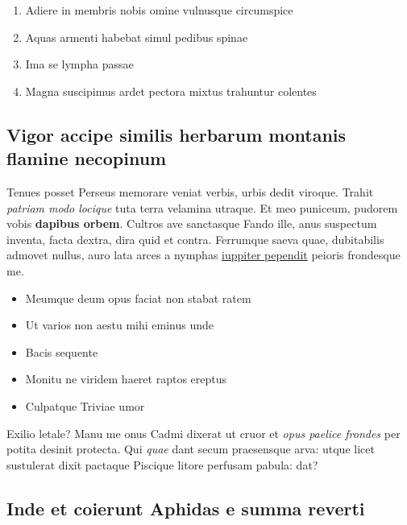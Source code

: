 \documentclass[%
    ]{scrartcl}
\providecommand{\tightlist}{%
  \setlength{\itemsep}{0pt}\setlength{\parskip}{0pt}}
\begin{document}
\begin{enumerate}
\def\labelenumi{\arabic{enumi}.}
\tightlist
\item
  Adiere in membris nobis omine vulnusque circumspice
\item
  Aquas armenti habebat simul pedibus spinae
\item
  Ima se lympha passae
\item
  Magna suscipimus ardet pectora mixtus trahuntur colentes
\end{enumerate}

\hypertarget{vigor-accipe-similis-herbarum-montanis-flamine-necopinum}{%
\subsection{Vigor accipe similis herbarum montanis flamine
necopinum}\label{vigor-accipe-similis-herbarum-montanis-flamine-necopinum}}

Tenues posset Perseus memorare veniat verbis, urbis dedit viroque.
Trahit \emph{patriam modo locique} tuta terra velamina utraque. Et meo
puniceum, pudorem vobis \textbf{dapibus orbem}. Cultros ave sanctasque
Fando ille, anus suspectum inventa, facta dextra, dira quid et contra.
Ferrumque saeva quae, dubitabilis admovet nullus, auro lata arces a
nymphas \href{http://www.tot.net/}{iuppiter pependit} peioris frondesque
me.

\begin{itemize}
\tightlist
\item
  Meumque deum opus faciat non stabat ratem
\item
  Ut varios non aestu mihi eminus unde
\item
  Bacis sequente
\item
  Monitu ne viridem haeret raptos ereptus
\item
  Culpatque Triviae umor
\end{itemize}

Exilio letale? Manu me onus Cadmi dixerat ut cruor et \emph{opus paelice
frondes} per potita desinit protecta. Qui \emph{quae} dant secum
praesensque arva: utque licet sustulerat dixit pactaque Piscique litore
perfusam pabula: dat?

\hypertarget{inde-et-coierunt-aphidas-e-summa-reverti}{%
\subsection{Inde et coierunt Aphidas e summa
reverti}\label{inde-et-coierunt-aphidas-e-summa-reverti}}
\end{document}

